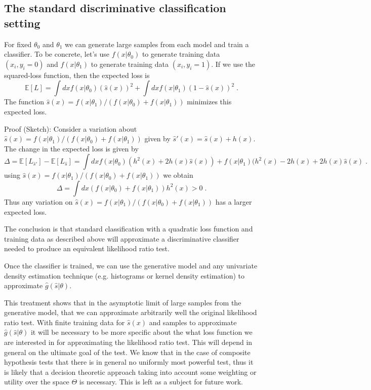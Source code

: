 \documentclass[11pt, oneside]{article}   	%
\begin{document}
\subsection{The standard discriminative classification setting} For fixed $\theta_0$ and $\theta_1$ we can generate 
large samples from each model and train a classifier. To be concrete, let's use $f(x|\theta_0)$ to generate training 
data $(x_i,  y_i=0)$ and $f(x|\theta_1)$ to generate training data $(x_i , y_i=1)$. 
If we use the squared-loss function, then the expected loss is
\begin{equation}
\mathbb{E}[L] = \int dx f(x|\theta_0)  (  \hat{s}(x) )^2  + \int dx f(x|\theta_1)  ( 1 - \hat{s}(x) )^2 \; .
\end{equation}
The function $\hat{s}(x) = f(x|\theta_1)/(f(x|\theta_0)+f(x|\theta_1))$ minimizes this expected loss.

Proof (Sketch): Consider a variation about $\hat{s}(x) = f(x|\theta_1)/(f(x|\theta_0)+f(x|\theta_1))$ given by $\hat{s}'(x) = \hat{s}(x) +h(x)$. The change in the expected loss is given by 
\begin{equation}
\Delta = \mathbb{E}[L_{\hat{s}'}]-\mathbb{E}[L_{\hat{s}}] = \int dx f(x|\theta_0)  (h^2(x) + 2 h(x)  \hat{s}(x) )  + f(x|\theta_1)   (h^2(x) - 2 h(x) + 2 h(x) \hat{s}(x)  \; .
\end{equation}
using $\hat{s}(x) = f(x|\theta_1)/(f(x|\theta_0)+f(x|\theta_1))$ we obtain
\begin{equation}
\Delta =  \int dx (f(x|\theta_0)+f(x|\theta_1))  h^2(x) >0    \; .
\end{equation}
Thus any variation on $\hat{s}(x) = f(x|\theta_1)/(f(x|\theta_0)+f(x|\theta_1))$ has a larger expected loss.

The conclusion is that standard classification with a quadratic loss function and training data as described above will approximate a discriminative classifier needed to produce an equivalent likelihood ratio test.

Once the classifier is trained, we can use the generative model and any univariate density estimation technique (e.g. histograms or kernel density estimation) to approximate $\hat{g}(\hat{s}|\theta)$.

This treatment shows that in the asymptotic limit of large samples from the generative model, that we can approximate arbitrarily well the original likelihood ratio test. With finite training data for $\hat{s}(x)$ and samples to approximate $\hat{g}(\hat{s}|\theta)$ it will be necessary to be more specific about the what loss function we are interested in for approximating the likelihood ratio test. This will depend in general on the ultimate goal of the test. We know that in the case of composite hypothesis tests that there is in general no uniformly most powerful test, thus it is likely that a decision theoretic approach taking into account some weighting or utility over the space $\Theta$ is necessary. This is left as a subject for future work.
\end{document}

